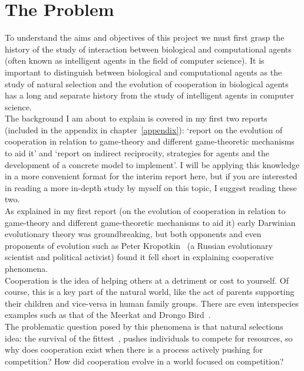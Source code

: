 \documentclass[]{final_report}
\begin{document}
\section{The Problem}
\label{section:problem}
To understand the aims and objectives of this project we must first grasp the history of the study of interaction between biological and computational agents (often known as intelligent agents in the field of computer science). It is important to distinguish between biological and computational agents as the study of natural selection and the evolution of cooperation in biological agents has a long and separate history from the study of intelligent agents in computer science.\\
The background I am about to explain is covered in my first two reports (included in the appendix in chapter~\ref{appendix}): `report on the evolution of cooperation in relation to game-theory and different game-theoretic mechanisms to aid it' and `report on indirect reciprocity, strategies for agents and the development of a concrete model to implement'. I will be applying this knowledge in a more convenient format for the interim report here, but if you are interested in reading a more in-depth study by myself on this topic, I suggest reading these two.\\
As explained in my first report (on the evolution of cooperation in relation to game-theory and different game-theoretic mechanisms to aid it) early Darwinian evolutionary theory was groundbreaking, but both opponents and even proponents of evolution such as Peter Kropotkin~\cite{kropotkin1902mutual} (a Russian evolutionary scientist and political activist) found it fell short in explaining cooperative phenomena.\\
Cooperation is the idea of helping others at a detriment or cost to yourself. Of course, this is a key part of the natural world, like the act of parents supporting their children and vice-versa in human family groups. There are even interspecies examples such as that of the Meerkat and Drongo Bird~\cite{bbcafrica}.\\
The problematic question posed by this phenomena is that natural selections idea: the survival of the fittest~\cite{spencer1864principles}, pushes individuals to compete for resources, so why does cooperation exist when there is a process actively pushing for competition? How did cooperation evolve in a world focused on competition?
\end{document}
